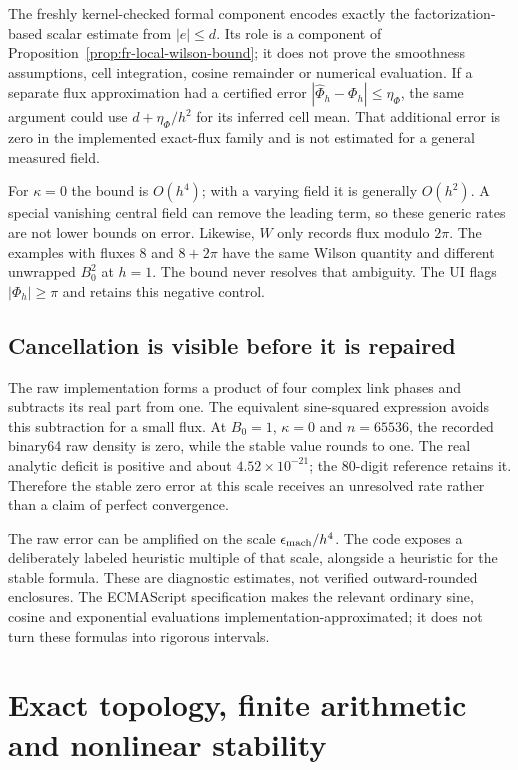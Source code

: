 The freshly kernel-checked formal component
encodes exactly the factorization-based scalar estimate from
$|e|\le d$. Its role is a component of
Proposition~\ref{prop:fr-local-wilson-bound}; it does not prove the
smoothness assumptions, cell integration, cosine remainder or numerical
evaluation. If a separate flux approximation had a certified error
$|\widehat\Phi_h-\Phi_h|\le\eta_\Phi$, the same argument could use
$d+\eta_\Phi/h^2$ for its inferred cell mean. That additional error is
zero in the implemented exact-flux family and is not estimated for a
general measured field.

For $\kappa=0$ the bound is $O(h^4)$; with a varying field it is
generally $O(h^2)$. A special vanishing central field can remove the
leading term, so these generic rates are not lower bounds on error.
Likewise, $W$ only records flux modulo $2\pi$. The examples with
fluxes $8$ and $8+2\pi$ have the same Wilson quantity and different
unwrapped $B_0^2$ at $h=1$. The bound never resolves that ambiguity.
The UI flags $|\Phi_h|\ge\pi$ and retains this negative control.

\subsection{Cancellation is visible before it is repaired}

The raw implementation forms a product of four complex link phases and
subtracts its real part from one. The equivalent sine-squared expression
avoids this subtraction for a small flux. At $B_0=1$, $\kappa=0$ and
$n=65536$, the recorded binary64 raw density is zero, while the stable
value rounds to one. The real analytic deficit is positive and about
$4.52\times10^{-21}$; the 80-digit reference retains it. Therefore
the stable zero error at this scale receives an unresolved rate rather
than a claim of perfect convergence.

The raw error can be amplified on the scale
$\epsilon_{\rm mach}/h^4$. The code exposes a deliberately labeled
heuristic multiple of that scale, alongside a heuristic for the stable
formula. These are diagnostic estimates, not verified outward-rounded
enclosures. The ECMAScript specification makes the relevant ordinary
sine, cosine and exponential evaluations implementation-approximated;
it does not turn these formulas into rigorous intervals.\cite{frECMAScriptLiving}

\section{Exact topology, finite arithmetic and nonlinear stability}

